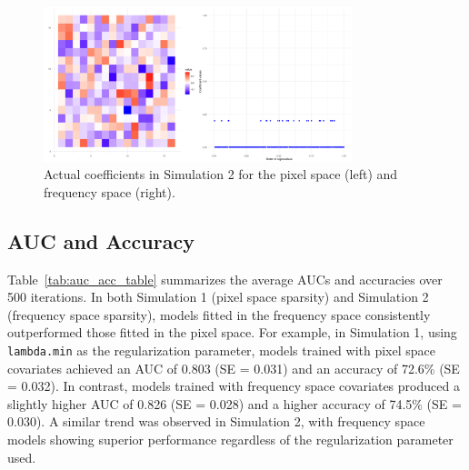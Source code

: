 \documentclass[12pt]{article}
\begin{document}
\begin{figure}[h!]
	\centering
	\includegraphics[width=0.8\textwidth, height=0.35\textwidth]{actual_coefs_sim2.png}
	\caption{Actual coefficients in Simulation 2 for the pixel space (left) and frequency space (right).}
	\label{fig:coefs_sim2}
\end{figure}

\FloatBarrier

\subsection*{AUC and Accuracy}

Table~\ref*{tab:auc_acc_table} summarizes the average AUCs and accuracies over 500 iterations. In both Simulation 1 (pixel space sparsity) and Simulation 2 (frequency space sparsity), models fitted in the frequency space consistently outperformed those fitted in the pixel space. For example, in Simulation 1, using \texttt{lambda.min} as the regularization parameter, models trained with pixel space covariates achieved an AUC of 0.803 (SE = 0.031) and an accuracy of 72.6\% (SE = 0.032). In contrast, models trained with frequency space covariates produced a slightly higher AUC of 0.826 (SE = 0.028) and a higher accuracy of 74.5\% (SE = 0.030). A similar trend was observed in Simulation 2, with frequency space models showing superior performance regardless of the regularization parameter used.
\end{document}
